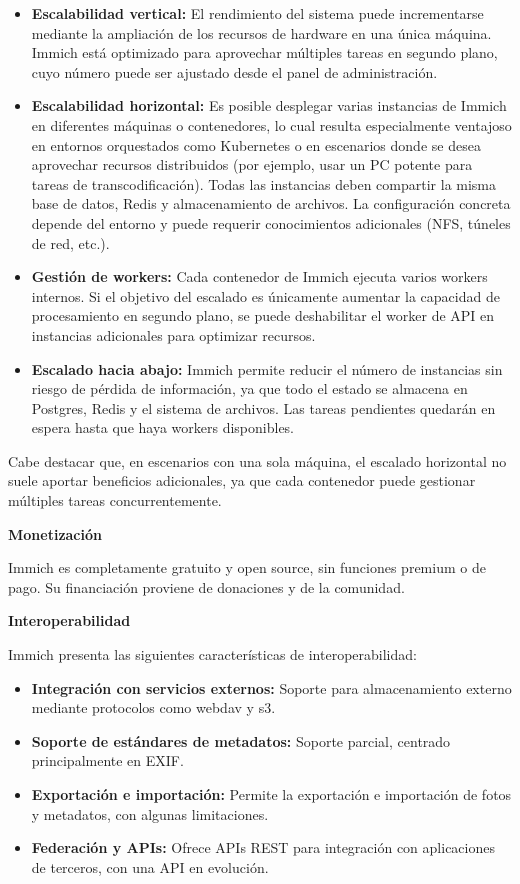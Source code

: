 \begin{itemize}
    \item \textbf{Escalabilidad vertical:} El rendimiento del sistema puede incrementarse mediante la ampliación de los recursos de hardware en una única máquina. Immich está optimizado para aprovechar múltiples tareas en segundo plano, cuyo número puede ser ajustado desde el panel de administración.
    \item \textbf{Escalabilidad horizontal:} Es posible desplegar varias instancias de Immich en diferentes máquinas o contenedores, lo cual resulta especialmente ventajoso en entornos orquestados como Kubernetes o en escenarios donde se desea aprovechar recursos distribuidos (por ejemplo, usar un PC potente para tareas de transcodificación). Todas las instancias deben compartir la misma base de datos, Redis y almacenamiento de archivos. La configuración concreta depende del entorno y puede requerir conocimientos adicionales (NFS, túneles de red, etc.).
    \item \textbf{Gestión de workers:} Cada contenedor de Immich ejecuta varios workers internos. Si el objetivo del escalado es únicamente aumentar la capacidad de procesamiento en segundo plano, se puede deshabilitar el worker de API en instancias adicionales para optimizar recursos.
    \item \textbf{Escalado hacia abajo:} Immich permite reducir el número de instancias sin riesgo de pérdida de información, ya que todo el estado se almacena en Postgres, Redis y el sistema de archivos. Las tareas pendientes quedarán en espera hasta que haya workers disponibles.
\end{itemize}

Cabe destacar que, en escenarios con una sola máquina, el escalado horizontal no suele aportar beneficios adicionales, ya que cada contenedor puede gestionar múltiples tareas concurrentemente.

\textbf{Monetización}

Immich es completamente gratuito y open source, sin funciones premium o de pago. Su financiación proviene de donaciones y de la comunidad.

\textbf{Interoperabilidad}

Immich presenta las siguientes características de interoperabilidad:

\begin{itemize}
    \item \textbf{Integración con servicios externos:} Soporte para almacenamiento externo mediante protocolos como \gls{webdav} y \gls{s3}.
    \item \textbf{Soporte de estándares de metadatos:} Soporte parcial, centrado principalmente en EXIF.
    \item \textbf{Exportación e importación:} Permite la exportación e importación de fotos y metadatos, con algunas limitaciones.
    \item \textbf{Federación y APIs:} Ofrece APIs REST para integración con aplicaciones de terceros, con una API en evolución.
\end{itemize}

